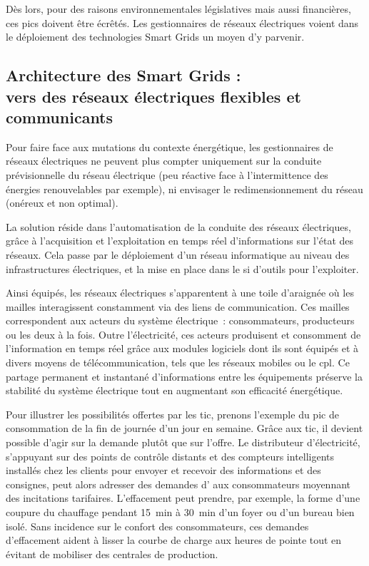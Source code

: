 Dès lors, pour des raisons environnementales législatives mais aussi financières, ces pics doivent être écrêtés.
Les gestionnaires de réseaux électriques voient dans le déploiement des
technologies Smart Grids un moyen d'y parvenir.




\subsection{Architecture des Smart Grids : \\
vers des réseaux électriques flexibles et communicants}

Pour faire face aux mutations du contexte énergétique, les gestionnaires de 
réseaux électriques ne peuvent plus compter uniquement sur la conduite 
prévisionnelle du réseau électrique (peu réactive face à l'intermittence des 
énergies renouvelables par exemple), ni envisager le redimensionnement du réseau 
(onéreux et non optimal). 

La solution réside dans l'automatisation de la conduite des réseaux électriques, 
grâce à l'acquisition et l'exploitation en temps réel d'informations sur l'état 
des réseaux. Cela passe par le déploiement d'un réseau informatique au niveau 
des infrastructures électriques, et la mise en place dans le \gls{si} d'outils 
pour l'exploiter.

Ainsi équipés, les réseaux électriques s'apparentent à une toile d'araignée où 
les mailles interagissent constamment via des liens de communication. Ces 
mailles correspondent aux acteurs du système électrique~: consommateurs, 
producteurs ou les deux à la fois. Outre l'électricité, ces acteurs produisent 
et consomment de l'information en temps réel grâce aux modules logiciels dont 
ils sont équipés et à divers moyens de télécommunication, tels que les réseaux 
mobiles ou le \gls{cpl}. Ce partage permanent et 
instantané d'informations entre les équipements préserve la stabilité du 
système électrique tout en augmentant son efficacité énergétique.

Pour illustrer les possibilités offertes par les \gls{tic}, prenons l'exemple 
du pic de consommation de la fin de journée d'un jour en semaine. Grâce aux 
\gls{tic}, il devient possible d'agir sur la demande plutôt que sur l'offre. Le
distributeur d'électricité, s'appuyant sur des points de contrôle distants et 
des compteurs intelligents installés chez les clients pour envoyer et recevoir 
des informations et des consignes, peut alors adresser des demandes 
d' aux consommateurs moyennant des incitations tarifaires. L'effacement peut
prendre, par exemple, la forme d'une coupure du chauffage pendant 15~min à 30~min d'un foyer ou d'un 
bureau bien isolé. Sans incidence sur le confort des consommateurs, ces 
demandes d'effacement aident à lisser la courbe de charge aux heures de pointe 
tout en évitant de mobiliser des centrales de production. 

